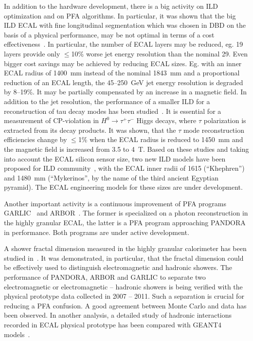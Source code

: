\documentclass{article}
\begin{document}
In addition to the hardware development, there is a big activity on ILD
optimization and on PFA algorithms. In particular, it was shown that the big
ILD ECAL with fine longitudinal segmentation which was chosen in DBD on the
basis of a physical performance, may be not optimal in terms of a cost
effectiveness~\cite{smallild}. In particular, the number of ECAL layers may be
reduced, eg. 19 layers provide only $\le$10\% worse jet energy resolution than
the nominal 29. Even bigger cost savings may be achieved by reducing ECAL
sizes. Eg. with an inner ECAL radius of 1400~mm instead of the nominal 1843~mm
and a proportional reduction of an ECAL length, the 45--250~GeV jet energy
resolution is degraded by 8--19\%. It may be partially compensated by an
increase in a magnetic field. In addition to the jet resolution, the
performance of a smaller ILD for a reconstruction of tau decay modes has been
studied~\cite{trantau}. It is essential for a measurement of CP-violation in
$H^0\to \tau^+\tau^-$ Higgs decays, where $\tau$ polarization is extracted
from its decay products. It was shown, that the $\tau$ mode reconstruction
efficiencies change by $\le$1\% when the ECAL radius is reduced to 1450~mm and
the magnetic field is increased from 3.5 to 4~T. Based on these studies and
taking into account the ECAL silicon sensor size, two new ILD models have been
proposed for ILD community~\cite{henrimodels}, with the ECAL inner radii of
1615 (``Khephren'') and 1480~mm (``Mykerinos'', by the name of the third
ancient Egyptian pyramid). The ECAL engineering models for these sizes are
under development.

Another important activity is a continuous improvement of PFA programs
GARLIC~\cite{garlic} and ARBOR~\cite{arbor}. The former is specialized on a
photon reconstruction in the highly granular ECAL, the latter is a PFA program
approaching PANDORA~\cite{pandora} in performance. Both programs are under
active development.

A shower fractal dimension measured in the highly granular calorimeter has
been studied in~\cite{fractal}. It was demonstrated, in particular, that the
fractal dimension could be effectively used to distinguish electromagnetic and
hadronic showers. The performance of PANDORA, ARBOR and GARLIC to separate two
electromagnetic or electromagnetic -- hadronic showers is being verified with
the physical prototype data collected in 2007 -- 2011. Such a separation is
crucial for reducing a PFA confusion. A good agreement between Monte Carlo and
data has been observed. In another analysis, a detailed study of hadronic
interactions recorded in ECAL physical prototype has been compared with GEANT4
models~\cite{naomi}.
\end{document}
